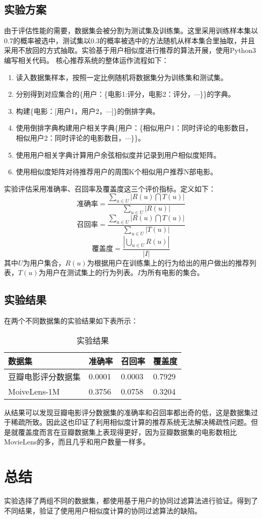 \documentclass[12pt,a4paper]{ctexart}
\begin{document}
\subsection{实验方案}
由于评估性能的需要，数据集会被分割为测试集及训练集。这里采用训练样本集以0.7的概率被选中，测试集以0.3的概率被选中的方法随机从样本集合里抽取，并且采用不放回的方式抽取。实验基于用户相似度进行推荐的算法开展，使用Python3编写相关代码。
核心推荐系统的整体运作流程如下：
\begin{enumerate}
	\item 读入数据集样本，按照一定比例随机将数据集分为训练集和测试集。
	\item 分别得到对应集合的\{用户：\{电影1:评分，电影2：评分，$\cdots$\}\}的字典。
	\item 构建\{电影：[用户1，用户2，$\cdots$]\}的倒排字典。
	\item 使用倒排字典构建用户相关字典\{用户：\{相似用户1：同时评论的电影数目，相似用户2：同时评论的电影数目，$\cdots$\}\}。
	\item 使用用户相关字典计算用户余弦相似度并记录到用户相似度矩阵。
	\item 使用相似度矩阵对待推荐用户的周围K个相似用户推荐N部电影。
		
\end{enumerate}


实验评估采用准确率、召回率及覆盖度这三个评价指标。定义如下：
\[ \mbox{准确率}=\frac{\sum_{u \in U}|R(u) \bigcap T(u)|}{\sum_{u \in U}|R(u)|} \]
\[ \mbox{召回率}=\frac{\sum_{u \in U}|R(u) \bigcap T(u)|}{\sum_{u \in U}|T(u)|} \]
\[ \mbox{覆盖度}=\frac{\left|\bigcup_{u \in U} R(u)\right|}{|I|} \]
其中$U$为用户集合，$R(u)$为根据用户在训练集上的行为给出的用户做出的推荐列表，$T(u)$为用户在测试集上的行为列表。$I$为所有电影的集合。
\subsection{实验结果}
在两个不同数据集的实验结果如下表所示：
\begin{table}[H]
		\centering
	\begin{tabular}{@{}llll@{}}
		\toprule
		数据集          & 准确率    & 召回率    & 覆盖度    \\ \midrule
		豆瓣电影评分数据集    & 0.0001 & 0.0003 & 0.7929 \\
		MoiveLens-1M & 0.3756 & 0.0758 & 0.3204 \\ \bottomrule
	\end{tabular}
	\caption{实验结果}
\label{table:exp_result}
\end{table}
从结果可以发现豆瓣电影评分数据集的准确率和召回率都出奇的低，这是数据集过于稀疏所致。因此这也印证了利用相似度计算的推荐系统无法解决稀疏性问题。但是就覆盖度而言在豆瓣数据集上表现得更好，因为豆瓣数据集的电影数相比MovieLens的多，而且几乎和用户数量一样多。




\section{总结}
实验选择了两组不同的数据集，都使用基于用户的协同过滤算法进行验证。得到了不同结果，验证了使用用户相似度计算的协同过滤算法的缺陷。


\printbibliography[heading=bibliography,title=参考文献]
\end{document}

